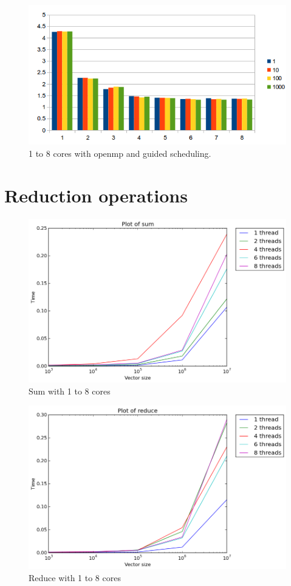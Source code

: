 \documentclass[10pt]{article}
\begin{document}
\break
\begin{figure}[h]
  \centering
    \includegraphics[width=\textwidth]{guided.png}
  \caption{1 to 8 cores with openmp and guided scheduling.}
\end{figure}
\break

\section{Reduction operations}
\begin{figure}[h]
  \centering
    \includegraphics[width=\textwidth]{sum.png}
  \caption{Sum with 1 to 8 cores}
\end{figure}
\break
\begin{figure}[h]
  \centering
    \includegraphics[width=\textwidth]{reduce.png}
  \caption{Reduce with 1 to 8 cores}
\end{figure}
\break
\end{document}
